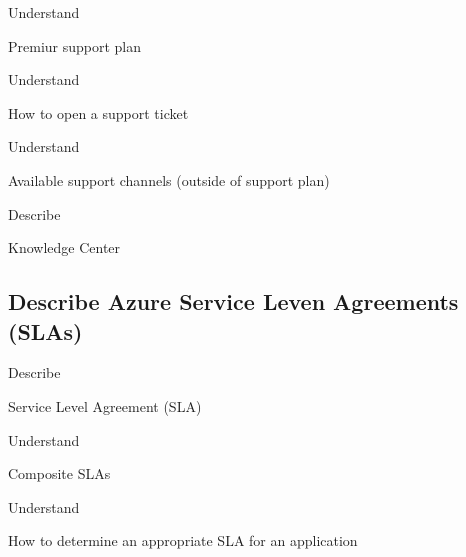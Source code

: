 \documentclass{scrartcl}
\newenvironment{flashcard}[2][]{%
    #1
    \vfill
    \centerline{\Large{#2}}
    \vfill
    \newpage
}
{\newpage}
\newcommand{\subsectioncard}[1]{
    \vspace*{\stretch{1}}
    \subsection{#1}
    \vspace*{\stretch{1}}
    \pagebreak
}
\begin{document}
    \begin{flashcard}[Understand]{Premiur support plan}

    \end{flashcard}

    \begin{flashcard}[Understand]{How to open a support ticket}

    \end{flashcard}

    \begin{flashcard}[Understand]{Available support channels (outside of support plan)}

    \end{flashcard}

    \begin{flashcard}[Describe]{Knowledge Center}

    \end{flashcard}

    \subsectioncard{Describe Azure Service Leven Agreements (SLAs)}

    \begin{flashcard}[Describe]{Service Level Agreement (SLA)}

    \end{flashcard}

    \begin{flashcard}[Understand]{Composite SLAs}

    \end{flashcard}

    \begin{flashcard}[Understand]{How to determine an appropriate SLA for an application}

    \end{flashcard}
\end{document}
